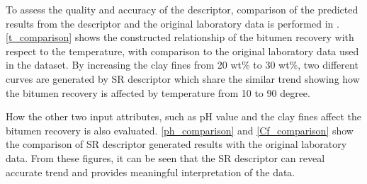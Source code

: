 \documentclass[final,5p,times,twocolumn]{elsarticle}
\begin{document}
To assess the quality and accuracy of the descriptor, comparison of the predicted results from the descriptor and the original laboratory data is performed in . \autoref{t_comparison} shows the constructed relationship of the bitumen recovery with respect to the temperature, with comparison to the original laboratory data used in the dataset. By increasing the clay fines from 20 wt\% to 30 wt\%, two different curves are generated by SR descriptor which share the similar trend showing how the bitumen recovery is affected by temperature from 10 to 90 degree.

How the other two input attributes, such as pH value and the clay fines affect the bitumen recovery is also evaluated. \autoref{ph_comparison} and \autoref{Cf_comparison} show the comparison of SR descriptor generated results with the original laboratory data. From these figures, it can be seen that the SR descriptor can reveal accurate trend and provides meaningful interpretation of the data.
\end{document}
